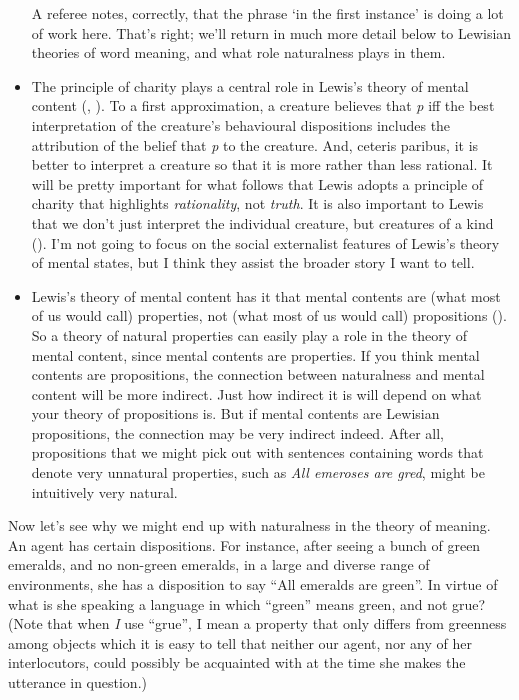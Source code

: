 \documentclass[
  10pt,
  letterpaper,
  DIV=11,
  numbers=noendperiod,
  twoside]{scrartcl}
\begin{document}
\begin{itemize}
{    A referee notes, correctly, that the phrase `in the first instance'
    is doing a lot of work here. That's right; we'll return in much more
    detail below to Lewisian theories of word meaning, and what role
    naturalness plays in them.}
\item
  The principle of charity plays a central role in Lewis's theory of
  mental content (,
  ). To a first approximation, a creature
  believes that \emph{p} iff the best interpretation of the creature's
  behavioural dispositions includes the attribution of the belief that
  \emph{p} to the creature. And, ceteris paribus, it is better to
  interpret a creature so that it is more rather than less rational. It
  will be pretty important for what follows that Lewis adopts a
  principle of charity that highlights \emph{rationality}, not
  \emph{truth}. It is also important to Lewis that we don't just
  interpret the individual creature, but creatures of a kind
  (). I'm not going to focus on the
  social externalist features of Lewis's theory of mental states, but I
  think they assist the broader story I want to tell.
\item
  Lewis's theory of mental content has it that mental contents are (what
  most of us would call) properties, not (what most of us would call)
  propositions (). So a theory of
  natural properties can easily play a role in the theory of mental
  content, since mental contents are properties. If you think mental
  contents are propositions, the connection between naturalness and
  mental content will be more indirect. Just how indirect it is will
  depend on what your theory of propositions is. But if mental contents
  are Lewisian propositions, the connection may be very indirect indeed.
  After all, propositions that we might pick out with sentences
  containing words that denote very unnatural properties, such as
  \emph{All emeroses are gred}, might be intuitively very natural.
\end{itemize}

Now let's see why we might end up with naturalness in the theory of
meaning. An agent has certain dispositions. For instance, after seeing a
bunch of green emeralds, and no non-green emeralds, in a large and
diverse range of environments, she has a disposition to say ``All
emeralds are green''. In virtue of what is she speaking a language in
which ``green'' means green, and not grue? (Note that when \emph{I} use
``grue'', I mean a property that only differs from greenness among
objects which it is easy to tell that neither our agent, nor any of her
interlocutors, could possibly be acquainted with at the time she makes
the utterance in question.)
\end{document}
